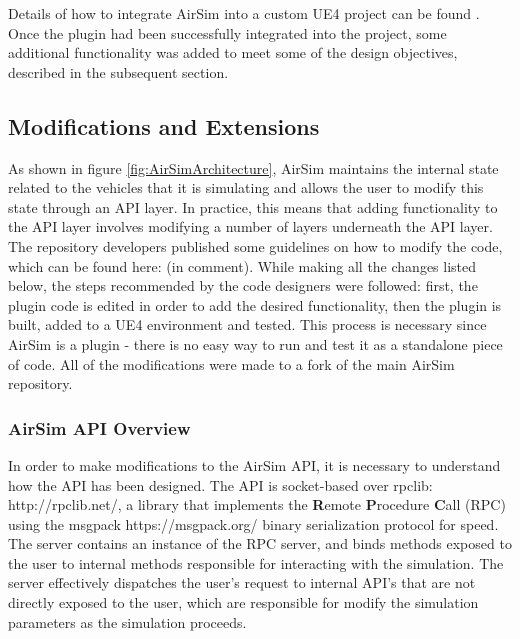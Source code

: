 Details of how to integrate AirSim into a custom UE4 project can be found %
. 
Once the plugin had been successfully integrated into the project, some additional functionality was added to meet some of the design objectives, described in the subsequent section.

\subsection{Modifications and Extensions}

As shown in figure \ref{fig:AirSimArchitecture}, AirSim maintains the internal state related to the vehicles that it is simulating and allows the user to modify this state through an API layer. In practice, this means that adding functionality to the API layer involves modifying a number of layers underneath the API layer. The repository developers published some guidelines on how to modify the code, which can be found here: (in comment). %
While making all the changes listed below, the steps recommended by the code designers were followed: first, the plugin code is edited in order to add the desired functionality, then the plugin is built, added to a UE4 environment and tested. This process is necessary since AirSim is a plugin - there is no easy way to run and test it as a standalone piece of code. All of the modifications were made to a fork of the main AirSim repository.

\subsubsection{AirSim API Overview}
In order to make modifications to the AirSim API, it is necessary to understand how the API has been designed. The API is socket-based over rpclib: http://rpclib.net/, a library that implements the \textbf{R}emote \textbf{P}rocedure \textbf{C}all (RPC) using the msgpack https://msgpack.org/ binary serialization protocol for speed. The server contains an instance of the RPC server, and binds methods exposed to the user to internal methods responsible for interacting with the simulation. The server effectively dispatches the user's request to internal API's that are not directly exposed to the user, which are responsible for modify the simulation parameters as the simulation proceeds.

